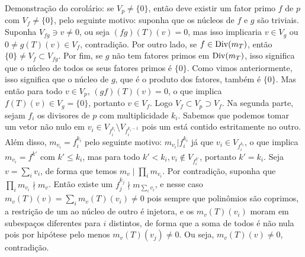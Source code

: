 \documentclass[../main.tex]{subfiles}
\begin{document}
Demonstração do corolário: se $V_{p}\neq\{0\}$, então deve existir um fator primo $f$ de $p$ com $V_{f}\neq\{0\}$, pelo seguinte motivo: suponha que os núcleos de $f\text{ e }g$ são triviais. Suponha $V_{fg}\ni v\neq0$, ou seja $(fg)(T)(v)=0$, mas isso implicaria $v\in V_{g}$ ou $0\neq g(T)(v)\in V_{f}$, contradição. Por outro lado, se $f\in\operatorname{Div}(m_{T})$, então $\{0\}\neq V_{f}\subset V_{fg}$. Por fim, se $g$ não tem fatores primos em $\operatorname{Div}(m_{T})$, isso significa que o núcleo de todos os seus fatores primos é $\{0\}$. Como vimos anteriormente, isso significa que o núcleo de $g$, que é o produto dos fatores, também é $\{0\}$. Mas então para todo $v\in V_{p}$, $(gf)(T)(v)=0$, o que implica $f(T)(v)\in V_{g}=\{0\}$, portanto $v\in V_{f}$. Logo $V_{f}\subset V_{p}\supset V_{f}$. Na segunda parte, sejam $f_{i}$ os divisores de $p$ com multiplicidade $k_{i}$. Sabemos que podemos tomar um vetor não nulo em $v_{i}\in V_{f_{i}^{k_{i}}}\setminus V_{f_{i}^{k_{i}-1}}$ pois um está contido estritamente no outro. Além disso, $m_{v_{i}}=f_{i}^{k_{i}}$ pelo seguinte motivo: $m_{v_{i}}|f_{i}^{k_{i}}$ já que $v_{i}\in V_{f_{i}^{k_{i}}}$, o que implica $m_{v_{i}}=f^{k'}$ com $k'\leq k_{i}$, mas para todo $k'<k_{i}, v_{i}\notin V_{f_{i}^{k'}}$, portanto $k'=k_{i}$. Seja $v=\sum_{i}v_{i}$, de forma que temos $m_{v}\mid\prod_{i}m_{v_{i}}$. Por contradição, suponha que $\prod_{i}m_{v_{i}}\nmid m_{v}$. Então existe um $f_{j}^{k_{j}}\nmid m_{\sum_{i}v_{i}}$, e nesse caso $m_{v}(T)(v)=\sum_{i}m_{v}(T)(v_{i})\neq0$ pois sempre que polinômios são coprimos, a restrição de um ao núcleo de outro é injetora, e os $m_{v}(T)(v_{i})$ moram em subespaços diferentes para $i$ distintos, de forma que a soma de todos é não nula pois por hipótese pelo menos $m_{v}(T)(v_{j})\neq0$. Ou seja, $m_{v}(T)(v)\neq0$, contradição. 
\end{document}

